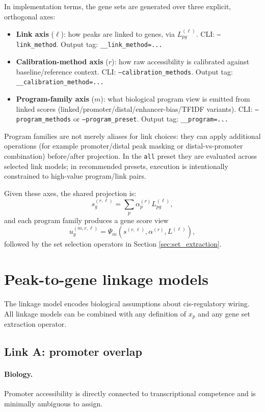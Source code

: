 \documentclass[11pt]{article}
\begin{document}
In implementation terms, the gene sets are generated over three explicit, orthogonal axes:
\begin{itemize}[leftmargin=2em]
\item \textbf{Link axis} ($\ell$): how peaks are linked to genes, via $L_{pg}^{(\ell)}$.
CLI: \texttt{--link\_method}. Output tag: \texttt{\_\_link\_method=...}
\item \textbf{Calibration-method axis} ($r$): how raw accessibility is calibrated against baseline/reference context.
CLI: \texttt{--calibration\_methods}. Output tag: \texttt{\_\_calibration\_method=...}
\item \textbf{Program-family axis} ($m$): what biological program view is emitted from linked scores (linked/promoter/distal/enhancer-bias/TFIDF variants).
CLI: \texttt{--program\_methods} or \texttt{--program\_preset}. Output tag: \texttt{\_\_program=...}
\end{itemize}
Program families are not merely aliases for link choices: they can apply additional operations (for example promoter/distal peak masking or distal-vs-promoter combination) before/after projection. In the \texttt{all} preset they are evaluated across selected link models; in recommended presets, execution is intentionally constrained to high-value program/link pairs.

Given these axes, the shared projection is:
\[
s_g^{(r,\ell)} = \sum_p \alpha_p^{(r)} L_{pg}^{(\ell)},
\]
and each program family produces a gene score view
\[
u_g^{(m,r,\ell)} = \Psi_m\!\left(s^{(r,\ell)}, \alpha^{(r)}, L^{(\ell)}\right),
\]
followed by the set selection operators in Section \ref{sec:set_extraction}.

\section{Peak-to-gene linkage models}
\label{sec:linkage_models}
The linkage model encodes biological assumptions about cis-regulatory wiring. All linkage models can be combined with any definition of $x_p$ and any gene set extraction operator.

\subsection{Link A: promoter overlap}
\paragraph{Biology.} Promoter accessibility is directly connected to transcriptional competence and is minimally ambiguous to assign.
\end{document}
